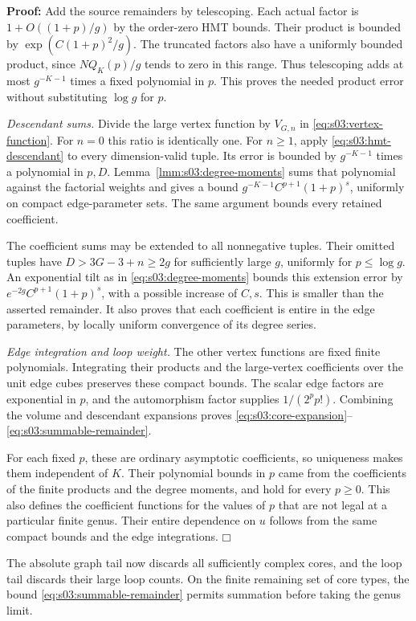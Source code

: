 \documentclass[a4paper,10pt]{article}
\numberwithin{equation}{section}
\theoremstyle{paperplain}
\theoremstyle{paperremark}
\theoremstyle{paperplain}
\newenvironment{prf}{\noindent \textbf{Proof: }}{\hfill $\mdlgwhtsquare$\par\addvspace{0.5\baselineskip}}
\begin{document}
\begin{prf}
Add the source remainders by telescoping. Each actual factor is
$1+O((1+p)/g)$ by the order-zero HMT bounds. Their product is
bounded by $\exp(C(1+p)^2/g)$. The truncated factors also have
a uniformly bounded product, since
$NQ_K(p)/g$ tends to zero in this range.
Thus telescoping adds at most $g^{-K-1}$ times a fixed polynomial
in $p$. This proves the needed product error without substituting
$\log g$ for $p$.

\smallskip\noindent
\emph{Descendant sums.}
Divide the large vertex function by $V_{G,n}$ in
\eqref{eq:s03:vertex-function}. For $n=0$ this ratio is identically
one. For $n\geq1$, apply
\eqref{eq:s03:hmt-descendant} to every dimension-valid tuple.
Its error is bounded by $g^{-K-1}$ times a polynomial in $p,D$.
Lemma~\ref{lmm:s03:degree-moments} sums that polynomial against
the factorial weights and gives a bound
$g^{-K-1}C^{p+1}(1+p)^s$, uniformly on compact edge-parameter sets.
The same argument bounds every retained coefficient.

The coefficient sums may be extended to all nonnegative tuples.
Their omitted tuples have $D>3G-3+n\geq2g$ for sufficiently
large $g$, uniformly for $p\leq\log g$.
An exponential tilt as in \eqref{eq:s03:degree-moments} bounds
this extension error by $e^{-2g}C^{p+1}(1+p)^s$, with a possible
increase of $C,s$. This is smaller than the asserted remainder.
It also proves that each coefficient is entire in the edge
parameters, by locally uniform convergence of its degree series.

\smallskip\noindent
\emph{Edge integration and loop weight.}
The other vertex functions are fixed finite polynomials. Integrating
their products and the large-vertex coefficients over the unit
edge cubes preserves these compact bounds. The scalar edge factors
are exponential in $p$, and the automorphism factor supplies
$1/(2^pp!)$. Combining the volume and descendant expansions proves
\eqref{eq:s03:core-expansion}--\eqref{eq:s03:summable-remainder}.

For each fixed $p$, these are ordinary asymptotic coefficients, so
uniqueness makes them independent of $K$. Their polynomial bounds
in $p$ came from the coefficients of the finite products and the
degree moments, and hold for every $p\geq0$. This also defines
the coefficient functions for the values of $p$ that are not legal
at a particular finite genus. Their entire dependence on $u$
follows from the same compact bounds and the edge integrations.
\end{prf}

The absolute graph tail now discards all sufficiently complex cores,
and the loop tail discards their large loop counts. On the finite
remaining set of core types, the bound
\eqref{eq:s03:summable-remainder} permits summation before taking
the genus limit.
\end{document}
